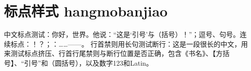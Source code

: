 \documentclass[a4paper,10pt,UTF8,scheme=chinese]{ctexart}
\begin{document}
\section{标点样式 hangmobanjiao}
中文标点测试：你好，世界。他说：“这是‘引号’与（括号）！”；逗号、句号。连续标点：！？；：……——。
行首禁则用长句测试断行：这是一段很长的中文，用来测试标点挤压、行首行尾禁则与断行位置是否正确，包含《书名》、【方括号】、“引号”和（圆括号），以及数字123和Latin。
\end{document}
